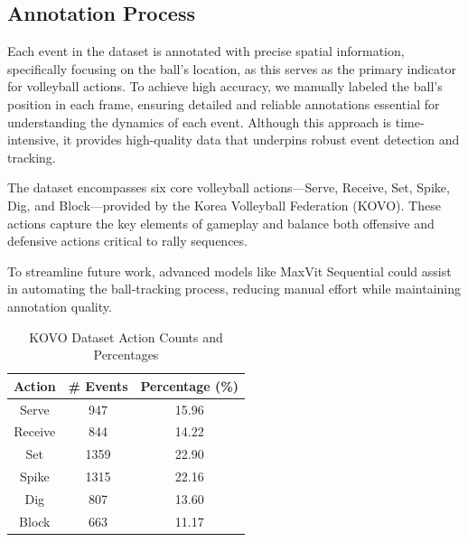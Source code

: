 \documentclass[conference]{IEEEtran}
\begin{document}

\subsection{Annotation Process}

Each event in the dataset is annotated with precise spatial information, specifically focusing on the ball’s location, as this serves as the primary indicator for volleyball actions. To achieve high accuracy, we manually labeled the ball’s position in each frame, ensuring detailed and reliable annotations essential for understanding the dynamics of each event. Although this approach is time-intensive, it provides high-quality data that underpins robust event detection and tracking.

The dataset encompasses six core volleyball actions—Serve, Receive, Set, Spike, Dig, and Block—provided by the Korea Volleyball Federation (KOVO). These actions capture the key elements of gameplay and balance both offensive and defensive actions critical to rally sequences.

To streamline future work, advanced models like MaxVit Sequential \cite{10.1145/3689061.3689075} could assist in automating the ball-tracking process, reducing manual effort while maintaining annotation quality.


\begin{table}[htbp]
    \caption{KOVO Dataset Action Counts and Percentages}
    \begin{center}
    \begin{tabular}{|c|c|c|}
    \hline
    \textbf{Action} & \textbf{\# Events} & \textbf{Percentage (\%)} \\
    \hline
    Serve & 947 & 15.96 \\
    Receive & 844 & 14.22 \\
    Set & 1359 & 22.90 \\
    Spike & 1315 & 22.16 \\
    Dig & 807 & 13.60 \\
    Block & 663 & 11.17 \\
    \hline
    \end{tabular}
    \label{tab-kovo-stat1}
    \end{center}
    \end{table}
    
\end{document}
